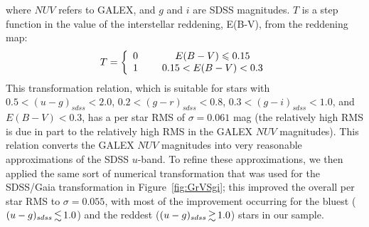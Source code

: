 \documentclass[fleqn,usenatbib]{mnras}
\begin{document}
where $NUV$ refers to GALEX, and $g$ and $i$ are SDSS magnitudes. $T$ is a step function in the value of the interstellar reddening, E(B-V),
from the \citet{1998ApJ...500..525S} reddening map:
\begin{align}
  T = \left\{ \begin{array}{cc} 
    0 & \hspace{5mm} E(B-V) \leq 0.15 \\
    1 & \hspace{5mm} 0.15 < E(B-V) < 0.3 \\
  \end{array} \right.
\end{align}
This transformation relation, which is suitable for stars with $0.5 <
(u-g)_{sdss} < 2.0$, $0.2 < (g-r)_{sdss} < 0.8$, $0.3 < (g-i)_{sdss} <
1.0$, and $E(B-V) < 0.3$, has a per star RMS of $\sigma=0.061$ mag
(the relatively high RMS is due in part to the relatively high RMS in
the GALEX $NUV$ magnitudes).  This relation converts the GALEX $NUV$
magnitudes into very reasonable approximations of the SDSS $u$-band.
To refine these approximations, we then applied the same sort of
numerical transformation that was used for the SDSS/Gaia
transformation in Figure~\ref{fig:GrVSgi}; this improved the overall
per star RMS to $\sigma=0.055$, with most of the improvement occurring
for the bluest ($(u-g)_{sdss} \la 1.0$) and the reddest ($(u-g)_{sdss}
\ga 1.0$) stars in our sample.
\end{document}
